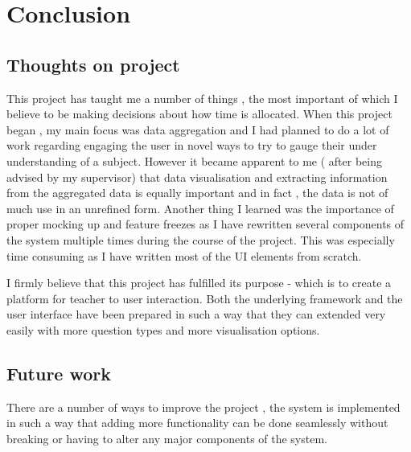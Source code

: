 \chapter{Conclusion}

\section{Thoughts on project}
This project has taught me a number of things , the most important of which I believe to be making decisions about how time is allocated.
When this project began , my main focus was data aggregation and I had planned to do a lot of work regarding engaging the user in novel ways to try to gauge their under understanding of a subject. However it became apparent to me ( after being advised by my supervisor) that data visualisation and extracting information from the aggregated data is equally important and in fact , the data is not of much use in an unrefined form.
Another thing I learned was the importance of proper mocking up and feature freezes as I have rewritten several components of the system multiple times during the course of the project. This was especially time consuming as I have written most of the UI elements from scratch.

I firmly believe that this project has fulfilled its purpose - which is to create a platform for teacher to user interaction. Both the underlying framework and the user interface have been prepared in such a way that they can extended very easily with more question types and more visualisation options.


\section{Future work}
There are a number of ways to improve the project , the system is implemented in such a way that adding more functionality can be done seamlessly without breaking or having to alter any major components of the system.

